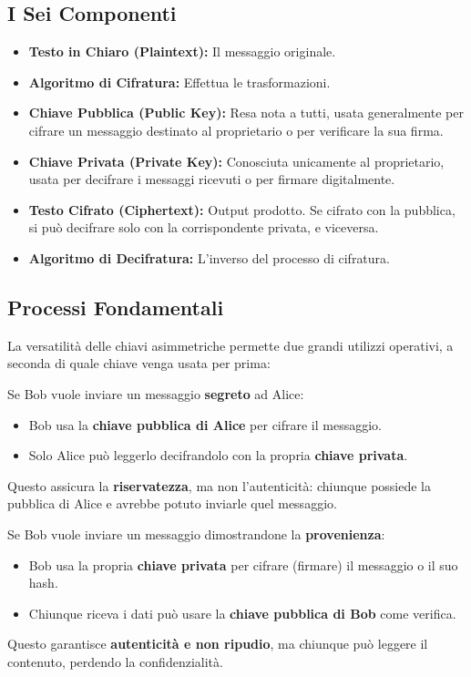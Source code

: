 \subsection{I Sei Componenti}
\begin{itemize}
    \item \textbf{Testo in Chiaro (Plaintext):} Il messaggio originale.
    \item \textbf{Algoritmo di Cifratura:} Effettua le trasformazioni.
    \item \textbf{Chiave Pubblica (Public Key):} Resa nota a tutti, usata generalmente per cifrare un messaggio destinato al proprietario o per verificare la sua firma.
    \item \textbf{Chiave Privata (Private Key):} Conosciuta unicamente al proprietario, usata per decifrare i messaggi ricevuti o per firmare digitalmente.
    \item \textbf{Testo Cifrato (Ciphertext):} Output prodotto. Se cifrato con la pubblica, si può decifrare solo con la corrispondente privata, e viceversa.
    \item \textbf{Algoritmo di Decifratura:} L'inverso del processo di cifratura.
\end{itemize}

\subsection{Processi Fondamentali}
La versatilità delle chiavi asimmetriche permette due grandi utilizzi operativi, a seconda di quale chiave venga usata per prima:

\begin{notebox}
Se Bob vuole inviare un messaggio \textbf{segreto} ad Alice:
\begin{itemize}
    \item Bob usa la \textbf{chiave pubblica di Alice} per cifrare il messaggio.
    \item Solo Alice può leggerlo decifrandolo con la propria \textbf{chiave privata}.
\end{itemize}
Questo assicura la \textbf{riservatezza}, ma non l'autenticità: chiunque possiede la pubblica di Alice e avrebbe potuto inviarle quel messaggio.
\end{notebox}

\begin{notebox}
Se Bob vuole inviare un messaggio dimostrandone la \textbf{provenienza}:
\begin{itemize}
    \item Bob usa la propria \textbf{chiave privata} per cifrare (firmare) il messaggio o il suo hash.
    \item Chiunque riceva i dati può usare la \textbf{chiave pubblica di Bob} come verifica.
\end{itemize}
Questo garantisce \textbf{autenticità e non ripudio}, ma chiunque può leggere il contenuto, perdendo la confidenzialità.
\end{notebox}

